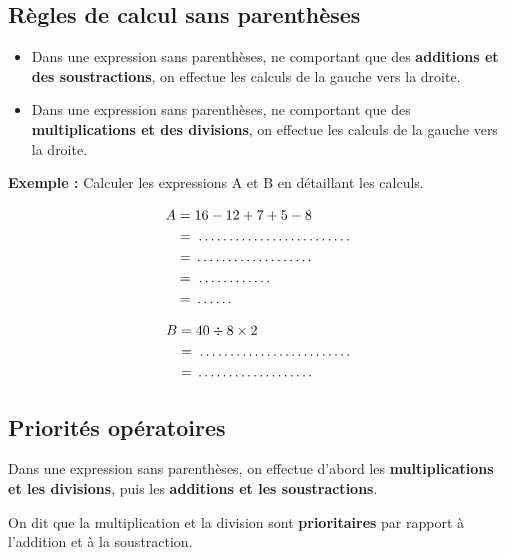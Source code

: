 \subsection{Règles de calcul sans parenthèses}
\begin{proprietebox}
\begin{itemize}[label = \textbullet]
\item Dans une expression sans parenthèses, ne comportant que des \textbf{additions et des soustractions}, on effectue les calculs de la gauche vers la droite.
\item Dans une expression sans parenthèses, ne comportant que des \textbf{multiplications et des divisions}, on effectue les calculs de la gauche vers la droite.
\end{itemize}
\end{proprietebox}

\begin{examplebox}
\textbf{Exemple :} Calculer les expressions A et B en détaillant les calculs.

\begin{minipage}[t]{0.48\textwidth}
\begin{align*}
A &= 16 - 12 + 7 + 5 - 8 \\
&= \trous{4cm} \\
&= \trous{3cm} \\
&= \trous{2cm} \\
&= \trous{1cm}
\end{align*}
\end{minipage}
\hfill
\begin{minipage}[t]{0.48\textwidth}
\begin{align*}
B &= 40 \div 8 \times 2 \\
&= \trous{4cm} \\
&= \trous{3cm}
\end{align*}
\end{minipage}
\end{examplebox}

\subsection{Priorités opératoires}
\begin{proprietebox}
Dans une expression sans parenthèses, on effectue d'abord les \textbf{multiplications et les divisions}, puis les \textbf{additions et les soustractions}. 

On dit que la multiplication et la division sont \textbf{prioritaires} par rapport à l'addition et à la soustraction.
\end{proprietebox}

